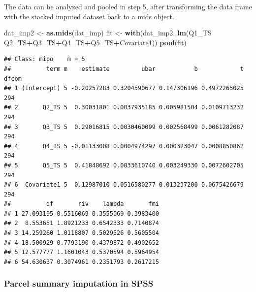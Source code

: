 \documentclass[
]{book}
\newenvironment{Shaded}{\begin{snugshade}}{\end{snugshade}}
\newcommand{\DataTypeTok}[1]{\textcolor[rgb]{0.13,0.29,0.53}{#1}}
\newcommand{\KeywordTok}[1]{\textcolor[rgb]{0.13,0.29,0.53}{\textbf{#1}}}
\newcommand{\NormalTok}[1]{#1}
\newcommand{\OperatorTok}[1]{\textcolor[rgb]{0.81,0.36,0.00}{\textbf{#1}}}
\newcommand{\OtherTok}[1]{\textcolor[rgb]{0.56,0.35,0.01}{#1}}
\newcommand{\StringTok}[1]{\textcolor[rgb]{0.31,0.60,0.02}{#1}}
\begin{document}
\begin{Shaded}
\end{Shaded}

The data can be analyzed and pooled in step 5, after transforming the
data frame with the stacked imputed dataset back to a mids object.

\begin{Shaded}
\begin{Highlighting}[]
\NormalTok{dat_imp2 <-}\StringTok{ }\KeywordTok{as.mids}\NormalTok{(dat_imp)}
\NormalTok{fit <-}\StringTok{ }\KeywordTok{with}\NormalTok{(dat_imp2, }\KeywordTok{lm}\NormalTok{(Q1_TS}\OperatorTok{~}\StringTok{ }\NormalTok{Q2_TS}\OperatorTok{+}\NormalTok{Q3_TS}\OperatorTok{+}\NormalTok{Q4_TS}\OperatorTok{+}\NormalTok{Q5_TS}\OperatorTok{+}\NormalTok{Covariate1))}
\KeywordTok{pool}\NormalTok{(fit)}
\end{Highlighting}
\end{Shaded}

\begin{verbatim}
## Class: mipo    m = 5 
##          term m    estimate         ubar           b            t dfcom
## 1 (Intercept) 5 -0.20257283 0.3204590677 0.147306196 0.4972265025   294
## 2       Q2_TS 5  0.30031801 0.0037935185 0.005981504 0.0109713232   294
## 3       Q3_TS 5  0.29016815 0.0030460099 0.002568499 0.0061282087   294
## 4       Q4_TS 5 -0.01133008 0.0004974297 0.000323047 0.0008850862   294
## 5       Q5_TS 5  0.41848692 0.0033610740 0.003249330 0.0072602705   294
## 6  Covariate1 5  0.12987010 0.0516580277 0.013237200 0.0675426679   294
##          df       riv    lambda       fmi
## 1 27.093195 0.5516069 0.3555069 0.3983400
## 2  8.553651 1.8921233 0.6542333 0.7140874
## 3 14.259260 1.0118807 0.5029526 0.5605504
## 4 18.500929 0.7793190 0.4379872 0.4902652
## 5 12.577777 1.1601043 0.5370594 0.5964954
## 6 54.630637 0.3074961 0.2351793 0.2617215
\end{verbatim}

\hypertarget{parcel-summary-imputation-in-spss}{%
\subsubsection{Parcel summary imputation in
SPSS}\label{parcel-summary-imputation-in-spss}}
\end{document}
